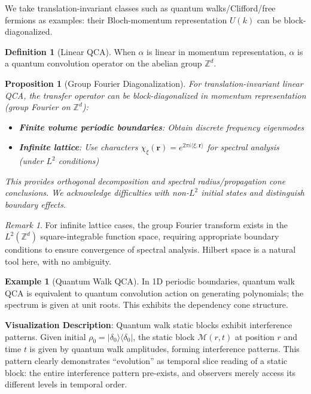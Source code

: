\documentclass[11pt]{article}
\newtheorem{proposition}[theorem]{Proposition}
\theoremstyle{definition}
\newtheorem{definition}[theorem]{Definition}
\newtheorem{example}[theorem]{Example}
\theoremstyle{remark}
\newtheorem{remark}[theorem]{Remark}
\begin{document}
We take translation-invariant classes such as quantum walks/Clifford/free fermions as examples: their Bloch-momentum representation \( U(k) \) can be block-diagonalized.

\begin{definition}[Linear QCA]\label{def:qlinear}
When \( \alpha \) is linear in momentum representation, \( \alpha \) is a quantum convolution operator on the abelian group \( \mathbb{Z}^d \).
\end{definition}

\begin{proposition}[Group Fourier Diagonalization]\label{prop:qfourier}
For translation-invariant linear QCA, the transfer operator can be block-diagonalized in momentum representation (group Fourier on \( \mathbb{Z}^d \)):
\begin{itemize}
\item \textbf{Finite volume periodic boundaries}: Obtain discrete frequency eigenmodes
\item \textbf{Infinite lattice}: Use characters \( \chi_\xi(\mathbf{r}) = e^{2\pi i \langle \xi, \mathbf{r} \rangle} \) for spectral analysis (under \( L^2 \) conditions)
\end{itemize}
This provides orthogonal decomposition and spectral radius/propagation cone conclusions. We acknowledge difficulties with non-\( L^2 \) initial states and distinguish boundary effects.
\end{proposition}

\begin{remark}
For infinite lattice cases, the group Fourier transform exists in the \( L^2(\mathbb{Z}^d) \) square-integrable function space, requiring appropriate boundary conditions to ensure convergence of spectral analysis. Hilbert space is a natural tool here, with no ambiguity.
\end{remark}

\begin{example}[Quantum Walk QCA]\label{ex:qwalk}
In 1D periodic boundaries, quantum walk QCA is equivalent to quantum convolution action on generating polynomials; the spectrum is given at unit roots. This exhibits the dependency cone structure.

\textbf{Visualization Description}: Quantum walk static blocks exhibit interference patterns. Given initial \( \rho_0 = |\delta_0\rangle\langle\delta_0| \), the static block \( \mathcal{M}(r,t) \) at position \( r \) and time \( t \) is given by quantum walk amplitudes, forming interference patterns. This pattern clearly demonstrates ``evolution'' as temporal slice reading of a static block: the entire interference pattern pre-exists, and observers merely access its different levels in temporal order.
\end{example}
\end{document}

